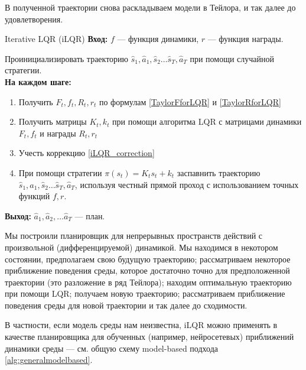 В полученной траектории снова раскладываем модели в Тейлора, и так далее до удовлетворения.

\begin{algorithm}{Iterative LQR (iLQR)}
\textbf{Вход:} $f$ --- функция динамики, $r$ --- функция награды.

\vspace{0.3cm}
Проинициализировать траекторию $\hat{s}_1, \hat{a}_1, \hat{s}_2 \dots \hat{s}_T, \hat{a}_T$ при помощи случайной стратегии. \\ 
\textbf{На каждом шаге:}
\begin{enumerate}
    \item Получить $F_t, f_t, R_t, r_t$ по формулам \eqref{TaylorFforLQR} и \eqref{TaylorRforLQR}
    \item Получить матрицы $K_t, k_t$ при помощи алгоритма LQR с матрицами динамики $F_t, f_t$ и награды $R_t, r_t$
    \item Учесть коррекцию \eqref{iLQR_correction}
    \item При помощи стратегии $\pi(s_t) = K_t s_t + k_t$ заспавнить траекторию $\hat{s}_1, \hat{a}_1, \hat{s}_2 \dots \hat{s}_T, \hat{a}_T$, используя честный прямой проход с использованием точных функций $f, r$.
\end{enumerate}

\vspace{0.3cm}
\textbf{Выход:} $\hat{a}_1, \hat{a}_2, \dots \hat{a}_T$ --- план.
\end{algorithm}

Мы построили планировщик для непрерывных пространств действий с произвольной (дифференцируемой) динамикой. Мы находимся в некотором состоянии, предполагаем свою будущую траекторию; рассматриваем некоторое приближение поведения среды, которое достаточно точно для предположенной траектории (это разложение в ряд Тейлора); находим оптимальную траекторию при помощи LQR; получаем новую траекторию; рассматриваем приближение поведения среды для новой траектории и так далее до сходимости.

В частности, если модель среды нам неизвестна, iLQR можно применять в качестве планировщика для обученных (например, нейросетевых) приближений динамики среды --- см. общую схему model-based подхода \ref{alg:generalmodelbased}.